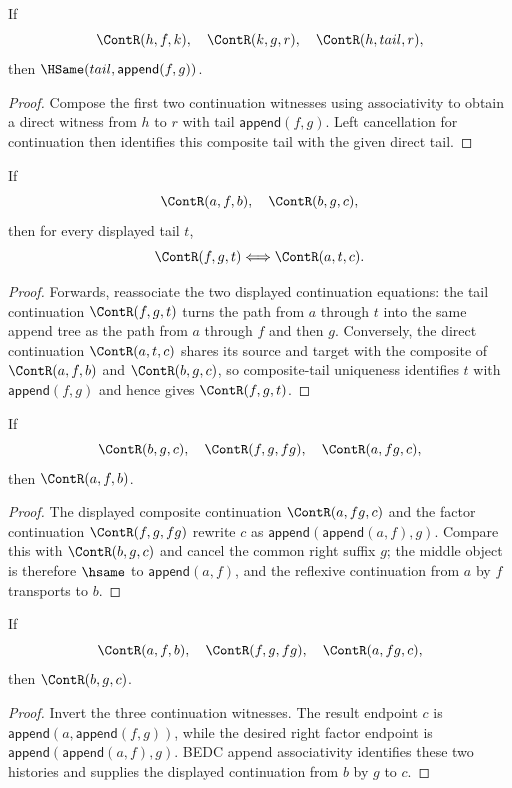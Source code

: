 \begin{theorem}
\label{thm:cont-composite-tail-unique}
If
$$
\ContR(h,f,k),\quad \ContR(k,g,r),\quad \ContR(h,tail,r),
$$
then $\HSame(tail,\mathsf{append}(f,g))$.
\end{theorem}
\begin{proof}
Compose the first two continuation witnesses using associativity to obtain a
direct witness from $h$ to $r$ with tail $\mathsf{append}(f,g)$.  Left
cancellation for continuation then identifies this composite tail with the
given direct tail.
\end{proof}

\begin{theorem}
\label{thm:cont-composite-tail-iff}
If
$$
\ContR(a,f,b),\quad \ContR(b,g,c),
$$
then for every displayed tail $t$,
$$
\ContR(f,g,t)\Longleftrightarrow \ContR(a,t,c).
$$
\end{theorem}
\begin{proof}
Forwards, reassociate the two displayed continuation equations: the tail
continuation $\ContR(f,g,t)$ turns the path from $a$ through $t$ into the same
append tree as the path from $a$ through $f$ and then $g$. Conversely, the direct
continuation $\ContR(a,t,c)$ shares its source and target with the composite of
$\ContR(a,f,b)$ and $\ContR(b,g,c)$, so composite-tail uniqueness identifies
$t$ with $\mathsf{append}(f,g)$ and hence gives $\ContR(f,g,t)$.
\end{proof}

\begin{theorem}
\label{thm:cont-composite-left-factor}
If
$$
\ContR(b,g,c),\quad \ContR(f,g,fg),\quad \ContR(a,fg,c),
$$
then $\ContR(a,f,b)$.
\end{theorem}
\begin{proof}
The displayed composite continuation $\ContR(a,fg,c)$ and the factor
continuation $\ContR(f,g,fg)$ rewrite $c$ as
$\mathsf{append}(\mathsf{append}(a,f),g)$. Compare this with
$\ContR(b,g,c)$ and cancel the common right suffix $g$; the middle object is
therefore $\hsame$ to $\mathsf{append}(a,f)$, and the reflexive continuation
from $a$ by $f$ transports to $b$.
\end{proof}

\begin{theorem}
\label{thm:cont-composite-right-factor}
If
$$
\ContR(a,f,b),\quad \ContR(f,g,fg),\quad \ContR(a,fg,c),
$$
then $\ContR(b,g,c)$.
\end{theorem}
\begin{proof}
Invert the three continuation witnesses. The result endpoint $c$ is
$\mathsf{append}(a,\mathsf{append}(f,g))$, while the desired right factor
endpoint is $\mathsf{append}(\mathsf{append}(a,f),g)$. BEDC append
associativity identifies these two histories and supplies the displayed
continuation from $b$ by $g$ to $c$.
\end{proof}

